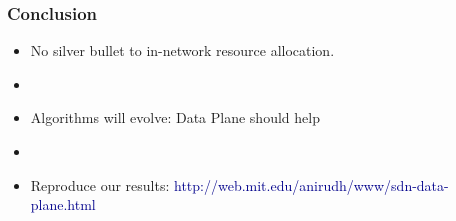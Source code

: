 \begin{Large}
\begin{frame}[plain]

\frametitle{Conclusion}
\begin{itemize}

\item No silver bullet to in-network resource allocation.

\item[]
\item Algorithms will evolve: Data Plane should help

\item[]
\item Reproduce our results: \textcolor{DarkBlue}{http://web.mit.edu/anirudh/www/sdn-data-plane.html} 

\end{itemize}
\end{frame}



\end{Large}
